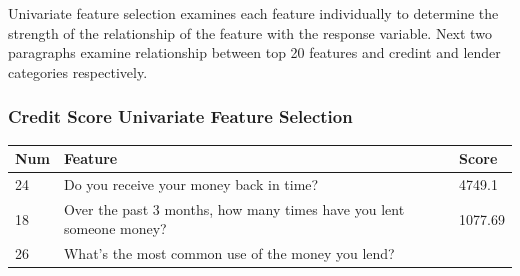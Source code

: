 Univariate feature selection examines each feature individually to
determine the strength of the relationship of the feature with the
response variable. Next two paragraphs examine relationship between top
20 features and credint and lender categories respectively.

\hypertarget{credit-score-univariate-feature-selection}{%
\subsubsection{Credit Score Univariate Feature
Selection}\label{credit-score-univariate-feature-selection}}

\begin{longtable}[]{@{}lll@{}}
\toprule
\begin{minipage}[b]{0.05\columnwidth}\raggedright
Num\strut
\end{minipage} & \begin{minipage}[b]{0.77\columnwidth}\raggedright
Feature\strut
\end{minipage} & \begin{minipage}[b]{0.09\columnwidth}\raggedright
Score\strut
\end{minipage}\tabularnewline
\midrule
\endhead
\begin{minipage}[t]{0.05\columnwidth}\raggedright
24\strut
\end{minipage} & \begin{minipage}[t]{0.77\columnwidth}\raggedright
Do you receive your money back in time?\strut
\end{minipage} & \begin{minipage}[t]{0.09\columnwidth}\raggedright
4749.1\strut
\end{minipage}\tabularnewline
\begin{minipage}[t]{0.05\columnwidth}\raggedright
18\strut
\end{minipage} & \begin{minipage}[t]{0.77\columnwidth}\raggedright
Over the past 3 months, how many times have you lent someone
money?\strut
\end{minipage} & \begin{minipage}[t]{0.09\columnwidth}\raggedright
1077.69\strut
\end{minipage}\tabularnewline
\begin{minipage}[t]{0.05\columnwidth}\raggedright
26\strut
\end{minipage} & \begin{minipage}[t]{0.77\columnwidth}\raggedright
What's the most common use of the money you lend?\strut

\end{minipage}
\end{longtable}
